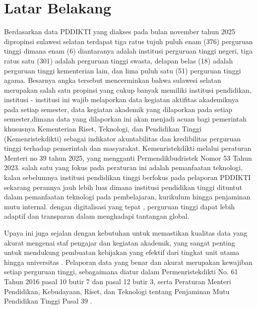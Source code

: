 \documentclass[12pt,a4paper,oneside]{report}
\begin{document}
        \section{Latar Belakang}
        \par
            Berdasarkan data PDDIKTI yang diakses pada bulan november tahun 2025 dipropinsi sulawesi selatan terdapat tiga ratus tujuh puluh enam (376) perguruan tinggi dimana enam (6)
            diantaranya adalah institusi perguruan tinggi negeri, tiga ratus satu (301) adalah perguruan tinggi swasta, delapan belas (18) adalah perguruan tinggi kementerian lain,
            dan lima puluh satu (51) perguruan tinggi agama. Besarnya angka tersebut mencerminkan bahwa sulawesi selatan merupakan salah satu propinsi yang cukup banyak memiliki institusi pendidikan,
            institusi - institusi ini wajib melaporkan data kegiatan aktifitas akademiknya pada setiap semester, data kegiatan akademik yang dilaporkan pada setiap semester,dimana data yang dilaporkan ini
            akan menjadi acuan bagi pemerintah khususnya Kementerian Riset, Teknologi, dan Pendidikan Tinggi (Kemenristekdikti) sebagai indikator akuntabilitas dan kredibilitas perguruan tinggi terhadap pemerintah
            dan masyarakat. Kemenristekdikti melalui peraturan Menteri no 39 tahun 2025, yang mengganti Permendikbudristek Nomor 53 Tahun 2023. salah satu yang fokus pada peraturan ini adalah pemanfaatan teknologi,
            kalau sebelumnya institusi pendidikan tinggi berfokus pada pelaporan PDDIKTI sekarang perannya jauh lebih luas dimana institusi pendidikan tinggi dituntut dalam pemanfaatan teknologi pada pembelajaran,
            kurikulum hingga penjaminan mutu internal. dengan digitalisasi yang tepat , perguruan tinggi dapat lebih adaptif  dan transparan  dalam menghadapi tantangan global.
        \par
            Upaya ini juga sejalan dengan kebutuhan untuk memastikan kualitas data yang akurat mengenai staf pengajar dan kegiatan akademik, yang sangat penting untuk mendukung pembuatan kebijakan yang efektif dari tingkat unit utama hingga universitas \parencite{rizky_tito_prasetyo_155f1543}.
            Pelaporan data yang benar dan akurat merupakan kewajiban setiap perguruan tinggi, sebagaimana diatur dalam Permenristekdikti No. 61 Tahun 2016 pasal 10 butir 7 dan pasal 12 butir 3,
            serta Peraturan Menteri Pendidikan, Kebudayaan, Riset, dan Teknologi tentang Penjaminan Mutu Pendidikan Tinggi Pasal 39  \parencite[]{menteri_pendidikan_fd83efd6, i_komang_arya_ganda_wiguna_09ebc916}.
\end{document}
